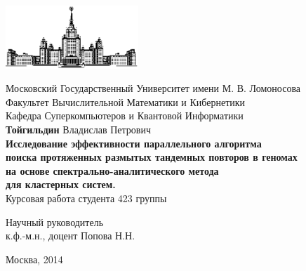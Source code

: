 \begin{titlepage}
\begin{center}

    \includegraphics[width=50mm]{image/msu4.eps}

    \bigskip
    Московский Государственный Университет имени М. В. Ломоносова\\
    Факультет Вычислительной Математики и Кибернетики\\

    \bigskip
    Кафедра Суперкомпьютеров и Квантовой Информатики\\[10mm]

    \large
    {{\bf Тойгильдин} Владислав Петрович\\}
    \bigskip
    \Large
    {\bf{Исследование эффективности параллельного алгоритма \\
        поиска протяженных размытых тандемных повторов в геномах \\
        на основе спектрально-аналитического метода \\
        для кластерных систем. \\}
    }
    \normalsize
    \bigskip
    Курсовая работа
    студента 423 группы
    \bigskip
    \bigskip
    \bigskip
    \bigskip
    \begin{flushright}
        Научный руководитель\\
        к.ф.-м.н., доцент Попова Н.Н.
    \end{flushright}
    \vspace{\fill}
    Москва, 2014
\end{center}
\end{titlepage}
\setcounter{page}{2}
